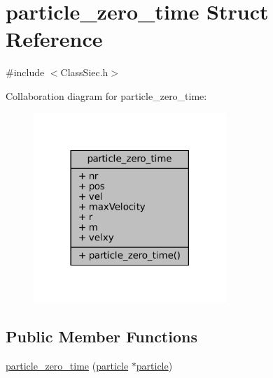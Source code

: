 \hypertarget{structparticle__zero__time}{}\section{particle\+\_\+zero\+\_\+time Struct Reference}
\label{structparticle__zero__time}


{\ttfamily \#include $<$Class\+Siec.\+h$>$}



Collaboration diagram for particle\+\_\+zero\+\_\+time\+:\nopagebreak
\begin{figure}[H]
\begin{center}
\leavevmode
\includegraphics[width=206pt]{structparticle__zero__time__coll__graph}
\end{center}
\end{figure}
\subsection*{Public Member Functions}
\begin{DoxyCompactItemize}
\item 
\mbox{\hyperlink{structparticle__zero__time_ac3abaccc3579eddbe304718deac0bcd0}{particle\+\_\+zero\+\_\+time}} (\mbox{\hyperlink{structparticle}{particle}} $\ast$\mbox{\hyperlink{structparticle}{particle}})
\end{DoxyCompactItemize}
